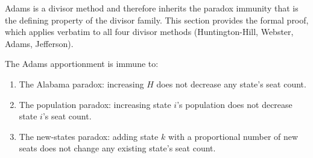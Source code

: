 \label{sec:paradox}

Adams is a divisor method and therefore inherits the paradox immunity
that is the defining property of the divisor family.
This section provides the formal proof, which applies verbatim to
all four divisor methods (Huntington-Hill, Webster, Adams, Jefferson).

\begin{theorem}
  \label{thm:adams-paradox}
  The Adams apportionment is immune to:
  \begin{enumerate}
    \item[(a)] The Alabama paradox: increasing $H$ does not decrease
      any state's seat count.
    \item[(b)] The population paradox: increasing state $i$'s population
      does not decrease state $i$'s seat count.
    \item[(c)] The new-states paradox: adding state $k$ with a proportional
      number of new seats does not change any existing state's seat count.
  \end{enumerate}
\end{theorem}

